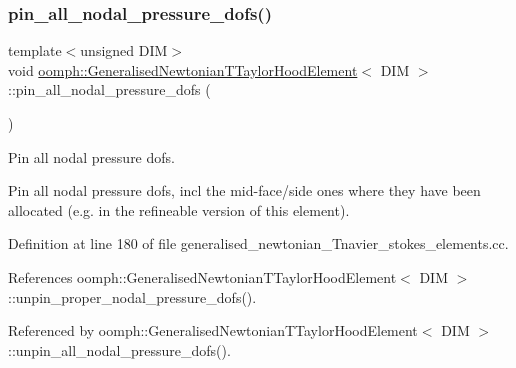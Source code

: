 \mbox{\label{classoomph_1_1GeneralisedNewtonianTTaylorHoodElement_a4416a4c750d3dfc0f24a3b0ad82b9eb9}} 
\subsubsection{\texorpdfstring{pin\+\_\+all\+\_\+nodal\+\_\+pressure\+\_\+dofs()}{pin\_all\_nodal\_pressure\_dofs()}}
{\footnotesize\ttfamily template$<$unsigned D\+IM$>$ \\
void \hyperlink{classoomph_1_1GeneralisedNewtonianTTaylorHoodElement}{oomph\+::\+Generalised\+Newtonian\+T\+Taylor\+Hood\+Element}$<$ D\+IM $>$\+::pin\+\_\+all\+\_\+nodal\+\_\+pressure\+\_\+dofs (\begin{DoxyParamCaption}{ }\end{DoxyParamCaption})\hspace{0.3cm}{\ttfamily [protected]}}



Pin all nodal pressure dofs. 

Pin all nodal pressure dofs, incl the mid-\/face/side ones where they have been allocated (e.\+g. in the refineable version of this element). 

Definition at line 180 of file generalised\+\_\+newtonian\+\_\+\+Tnavier\+\_\+stokes\+\_\+elements.\+cc.



References oomph\+::\+Generalised\+Newtonian\+T\+Taylor\+Hood\+Element$<$ D\+I\+M $>$\+::unpin\+\_\+proper\+\_\+nodal\+\_\+pressure\+\_\+dofs().



Referenced by oomph\+::\+Generalised\+Newtonian\+T\+Taylor\+Hood\+Element$<$ D\+I\+M $>$\+::unpin\+\_\+all\+\_\+nodal\+\_\+pressure\+\_\+dofs().

\mbox{\label{classoomph_1_1GeneralisedNewtonianTTaylorHoodElement_a6275b1519211476d13fcb08236def908}} 
